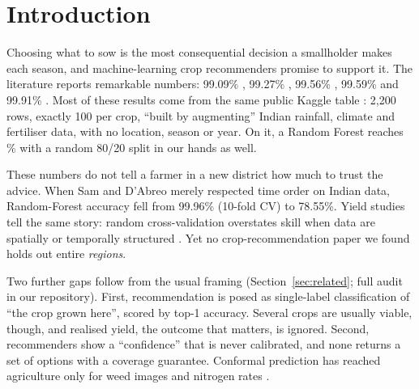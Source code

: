 \documentclass[conference]{IEEEtran}
\begin{document}
\section{Introduction}

Choosing what to sow is the most consequential decision a smallholder makes each season, and
machine-learning crop recommenders promise to support it. The literature reports remarkable
numbers: 99.09\% \cite{dey2024}, 99.27\% \cite{shastri2025}, 99.56\% \cite{ahmed2025},
99.59\% \cite{elbasi2023} and 99.91\% \cite{kulkarni2018}. Most of these results come from the
same public Kaggle table \cite{ingle2020kaggle}: 2,200 rows, exactly 100 per crop, ``built by
augmenting'' Indian rainfall, climate and fertiliser data, with no location, season or year. On
it, a Random Forest reaches \KaggleRF\% with a random 80/20 split in our hands as well.

These numbers do not tell a farmer in a new district how much to trust the advice. When Sam and
D'Abreo \cite{sam2025} merely respected time order on Indian data, Random-Forest accuracy fell
from 99.96\% (10-fold CV) to 78.55\%. Yield studies tell the same story: random cross-validation
overstates skill when data are spatially or temporally structured
\cite{roberts2017,meyer2019,zhang2026,baatz2025,asif2026}. Yet no crop-recommendation paper we
found holds out entire \emph{regions}.

Two further gaps follow from the usual framing (Section~\ref{sec:related}; full audit in our
repository). First, recommendation is posed as single-label classification of ``the crop grown
here'', scored by top-1 accuracy. Several crops are usually viable, though, and realised yield, the
outcome that matters, is ignored. Second, recommenders show a ``confidence'' that is never
calibrated, and none returns a set of options with a coverage guarantee. Conformal prediction
\cite{angelopoulos2021} has reached agriculture only for weed images \cite{melki2023,melki2025} and
nitrogen rates \cite{khan2026}.
\end{document}
